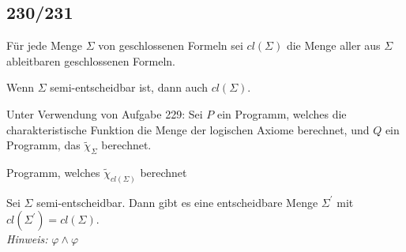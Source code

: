 \subsection*{230/231}

Für jede Menge $\Sigma$ von geschlossenen Formeln sei $cl(\Sigma)$
die Menge aller aus $\Sigma$ ableitbaren geschlossenen Formeln.
\begin{exercise}[230]

Wenn $\Sigma$ semi-entscheidbar ist, dann auch $cl(\Sigma)$.

\end{exercise}


\begin{solution}
Unter Verwendung von Aufgabe 229: Sei $P$ ein Programm, welches die
charakteristische Funktion die Menge der logischen Axiome berechnet,
und $Q$ ein Programm, das $\tilde{\chi}_\Sigma$ berechnet.

\begin{algorithm}
    \caption{Programm, welches $\tilde{\chi}_{cl(\Sigma)}$ berechnet}
    \begin{algorithmic}[1]
        \State {}
        \EndIf
    \EndProcedure
    \end{algorithmic}
\end{algorithm}

\end{solution}

\begin{exercise}[231]

Sei $\Sigma$ semi-entscheidbar. Dann gibt es eine entscheidbare Menge $\Sigma^{\prime}$
mit $cl(\Sigma^{\prime}) = cl(\Sigma)$. \\
\textit{Hinweis:} $\varphi \land \varphi$

\end{exercise}
